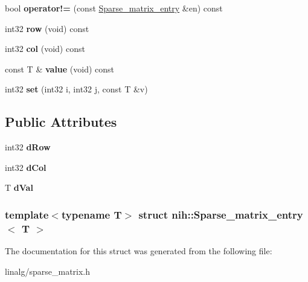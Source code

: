 \begin{DoxyCompactItemize}
\item 
\hypertarget{structnih_1_1_sparse__matrix__entry_a1541785e1a084666fd314ae4541a0b64}{
bool {\bfseries operator!=} (const \hyperlink{structnih_1_1_sparse__matrix__entry}{\-Sparse\-\_\-matrix\-\_\-entry} \&en) const }
\label{structnih_1_1_sparse__matrix__entry_a1541785e1a084666fd314ae4541a0b64}

\item 
\hypertarget{structnih_1_1_sparse__matrix__entry_a23d243f446af3e80b2f52f8d163c67ab}{
int32 {\bfseries row} (void) const }
\label{structnih_1_1_sparse__matrix__entry_a23d243f446af3e80b2f52f8d163c67ab}

\item 
\hypertarget{structnih_1_1_sparse__matrix__entry_afdd887c8b38a7c6f34f44d891bc404be}{
int32 {\bfseries col} (void) const }
\label{structnih_1_1_sparse__matrix__entry_afdd887c8b38a7c6f34f44d891bc404be}

\item 
\hypertarget{structnih_1_1_sparse__matrix__entry_acff68bb5e1dc294cf834fb5451b11fcd}{
const \-T \& {\bfseries value} (void) const }
\label{structnih_1_1_sparse__matrix__entry_acff68bb5e1dc294cf834fb5451b11fcd}

\item 
\hypertarget{structnih_1_1_sparse__matrix__entry_abdfdc8c1a50a5c772fe1935fefb8f352}{
int32 {\bfseries set} (int32 i, int32 j, const \-T \&v)}
\label{structnih_1_1_sparse__matrix__entry_abdfdc8c1a50a5c772fe1935fefb8f352}

\end{DoxyCompactItemize}
\subsection*{\-Public \-Attributes}
\begin{DoxyCompactItemize}
\item 
\hypertarget{structnih_1_1_sparse__matrix__entry_a4d481f251a7904fea13ff880c2d1f357}{
int32 {\bfseries d\-Row}}
\label{structnih_1_1_sparse__matrix__entry_a4d481f251a7904fea13ff880c2d1f357}

\item 
\hypertarget{structnih_1_1_sparse__matrix__entry_ac5ad3b16ba4ec80c9205004a8a23a71c}{
int32 {\bfseries d\-Col}}
\label{structnih_1_1_sparse__matrix__entry_ac5ad3b16ba4ec80c9205004a8a23a71c}

\item 
\hypertarget{structnih_1_1_sparse__matrix__entry_a3b8edf0b4fa59c6765f700c9e1de6614}{
\-T {\bfseries d\-Val}}
\label{structnih_1_1_sparse__matrix__entry_a3b8edf0b4fa59c6765f700c9e1de6614}

\end{DoxyCompactItemize}
\subsubsection*{template$<$typename T$>$ struct nih\-::\-Sparse\-\_\-matrix\-\_\-entry$<$ T $>$}



\-The documentation for this struct was generated from the following file\-:\begin{DoxyCompactItemize}
\item 
linalg/sparse\-\_\-matrix.\-h\end{DoxyCompactItemize}
